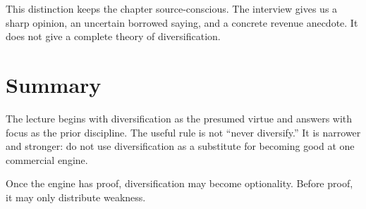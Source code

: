 This distinction keeps the chapter source-conscious. The interview gives us a sharp opinion, an uncertain borrowed saying, and a concrete revenue anecdote. It does not give a complete theory of diversification.

\section{Summary}

The lecture begins with diversification as the presumed virtue and answers with focus as the prior discipline. The useful rule is not ``never diversify.'' It is narrower and stronger: do not use diversification as a substitute for becoming good at one commercial engine.

Once the engine has proof, diversification may become optionality. Before proof, it may only distribute weakness.